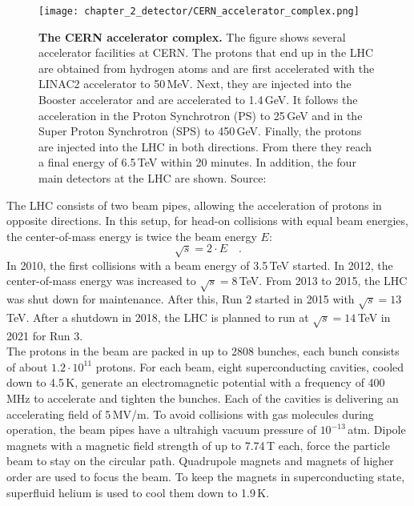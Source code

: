 \begin{figure}
\centering
\texttt{[image: chapter\_2\_detector/CERN\_accelerator\_complex.png]}
\caption[CERN Accelerator Complex]{\textbf{The CERN accelerator complex.} The figure shows several accelerator facilities at CERN. The protons that end up in the LHC are obtained from hydrogen atoms and are first accelerated with the \textcolor{LINAC2}{LINAC2} accelerator to 50\,MeV. Next, they are injected into the \textcolor{LINAC2}{Booster} accelerator and are accelerated to 1.4\,GeV. It follows the acceleration in the \textcolor{PS}{Proton Synchrotron (PS)} to 25\,GeV and in the \textcolor{SPS}{Super Proton Synchrotron (SPS)} to 450\,GeV. Finally, the protons are injected into the \textcolor{LHC}{LHC} in both directions. From there they reach a final energy of 6.5\,TeV within 20 minutes. In addition, the four main detectors at the LHC are shown. Source: \cite{cernacccompl}}
\label{fig:ch_2_cernacccompl}
\end{figure}

The LHC consists of two beam pipes, allowing the acceleration of protons in opposite directions. In this setup, for head-on collisions with equal beam energies, the center-of-mass energy is twice the beam energy $E$:
\begin{equation}
\sqrt{s} = 2 \cdot E \quad .
\end{equation}
In 2010, the first collisions with a beam energy of 3.5\,TeV started. In 2012, the center-of-mass energy was increased to $\sqrt{s} = 8$\,TeV. From 2013 to 2015, the LHC was shut down for maintenance. After this, Run 2 started in 2015 with $\sqrt{s} = 13$\,TeV. After a shutdown in 2018, the LHC is planned to run at $\sqrt{s} = 14$\,TeV in 2021 for Run 3. \\

The protons in the beam are packed in up to 2808 bunches, each bunch consists of about $1.2 \cdot 10^{11}$ protons. For each beam, eight superconducting cavities, cooled down to 4.5\,K, generate an electromagnetic potential with a frequency of 400\,MHz to accelerate and tighten the bunches. Each of the cavities is delivering an accelerating field of 5\,MV/m. To avoid collisions with gas molecules during operation, the beam pipes have a ultrahigh vacuum pressure of $10^{-13}$\,atm. Dipole magnets with a magnetic field strength of up to 7.74\,T each, force the particle beam to stay on the circular path. Quadrupole magnets and magnets of higher order are used to focus the beam. To keep the magnets in superconducting state, superfluid helium is used to cool them down to 1.9\,K. \\

